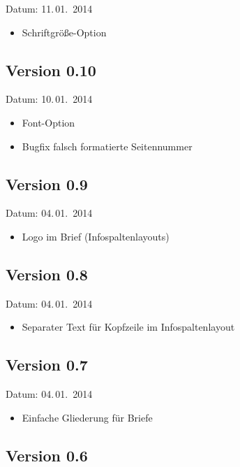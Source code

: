 Datum: 11.\,01.~2014

\begin{itemize}
	\item Schriftgröße-Option 
\end{itemize}

\subsection{Version 0.10}

Datum: 10.\,01.~2014

\begin{itemize}
	\item Font-Option 
	\item Bugfix falsch formatierte Seitennummer
\end{itemize}

\subsection{Version 0.9}

Datum: 04.\,01.~2014

\begin{itemize}
	\item Logo im Brief (Infospaltenlayouts)
\end{itemize}

\subsection{Version 0.8}

Datum: 04.\,01.~2014

\begin{itemize}
	\item Separater Text für Kopfzeile im Infospaltenlayout
\end{itemize}

\subsection{Version 0.7}

Datum: 04.\,01.~2014

\begin{itemize}
	\item Einfache Gliederung für Briefe
\end{itemize}

\subsection{Version 0.6}

